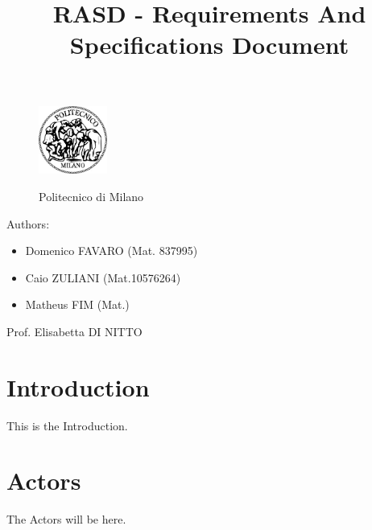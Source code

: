 \documentclass[a4paper]{article}
\title{RASD - Requirements And Specifications Document}
\begin{document}
\begin{titlepage}
\begin{figure}
\centering
\includegraphics[width=0.2\textwidth]{polimi.jpg}
\par
\LARGE Politecnico di Milano
\end{figure}


\maketitle
\raggedright
Authors:
\begin{itemize}
	\item Domenico FAVARO (Mat. 837995)
	\item Caio ZULIANI (Mat.10576264)
	\item Matheus FIM (Mat.)
\end{itemize}
\raggedleft
Prof. Elisabetta DI NITTO
\end{titlepage}

\tableofcontents
\newpage
 
\section{Introduction}
 
This is the Introduction.

\section{Actors}
 
The Actors will be here.
\end{document}
